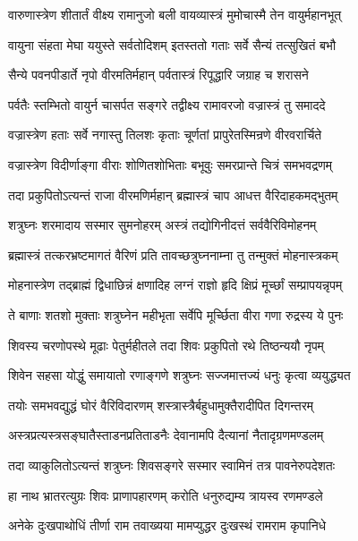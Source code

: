 \twolineshloka
{वारुणास्त्रेण शीतार्तं वीक्ष्य रामानुजो बली}
{वायव्यास्त्रं मुमोचास्मै तेन वायुर्महानभूत्}%

\twolineshloka
{वायुना संहता मेघा ययुस्ते सर्वतोदिशम्}
{इतस्ततो गताः सर्वे सैन्यं तत्सुखितं बभौ}%

\twolineshloka
{सैन्ये पवनपीडार्ते नृपो वीरमतिर्महान्}
{पर्वतास्त्रं रिपूद्धारि जग्राह च शरासने}%

\twolineshloka
{पर्वतैः स्तम्भितो वायुर्न चासर्पत सङ्गरे}
{तद्वीक्ष्य रामावरजो वज्रास्त्रं तु समाददे}%

\twolineshloka
{वज्रास्त्रेण हताः सर्वे नगास्तु तिलशः कृताः}
{चूर्णतां प्रापुरेतस्मिन्रणे वीरवरार्चिते}%

\twolineshloka
{वज्रास्त्रेण विदीर्णाङ्गा वीराः शोणितशोभिताः}
{बभूवुः समरप्रान्ते चित्रं समभवद्रणम्}%

\twolineshloka
{तदा प्रकुपितोऽत्यन्तं राजा वीरमणिर्महान्}
{ब्रह्मास्त्रं चाप आधत्त वैरिदाहकमद्भुतम्}%

\twolineshloka
{शत्रुघ्नः शरमादाय सस्मार सुमनोहरम्}
{अस्त्रं तद्योगिनीदत्तं सर्ववैरिविमोहनम्}%

\twolineshloka
{ब्रह्मास्त्रं तत्करभ्रष्टमागतं वैरिणं प्रति}
{तावच्छत्रुघ्ननाम्ना तु तन्मुक्तं मोहनास्त्रकम्}%

\twolineshloka
{मोहनास्त्रेण तद्ब्राह्मं द्विधाछिन्नं क्षणादिह}
{लग्नं राज्ञो हृदि क्षिप्रं मूर्च्छां सम्प्रापयन्नृपम्}%

\twolineshloka
{ते बाणाः शतशो मुक्ताः शत्रुघ्नेन महीभृता}
{सर्वेपि मूर्च्छिता वीरा गणा रुद्रस्य ये पुनः}%

\twolineshloka
{शिवस्य चरणोपस्थे मूढाः पेतुर्महीतले}
{तदा शिवः प्रकुपितो रथे तिष्ठन्ययौ नृपम्}%

\twolineshloka
{शिवेन सहसा योद्धुं समायातो रणाङ्गणे}
{शत्रुघ्नः सज्जमात्तज्यं धनुः कृत्वा व्ययुद्ध्यत}%

\twolineshloka
{तयोः समभवद्युद्धं घोरं वैरिविदारणम्}
{शस्त्रास्त्रैर्बहुधामुक्तैरादीपित दिगन्तरम्}%

\twolineshloka
{अस्त्रप्रत्यस्त्रसङ्घातैस्ताडनप्रतिताडनैः}
{देवानामपि दैत्यानां नैतादृग्रणमण्डलम्}%

\twolineshloka
{तदा व्याकुलितोऽत्यन्तं शत्रुघ्नः शिवसङ्गरे}
{सस्मार स्वामिनं तत्र पावनेरुपदेशतः}%

\twolineshloka
{हा नाथ भ्रातरत्युग्रः शिवः प्राणापहारणम्}
{करोति धनुरुद्यम्य त्रायस्व रणमण्डले}%

\twolineshloka
{अनेके दुःखपाथोधिं तीर्णा राम तवाख्यया}
{मामप्युद्धर दुःखस्थं रामराम कृपानिधे}%

